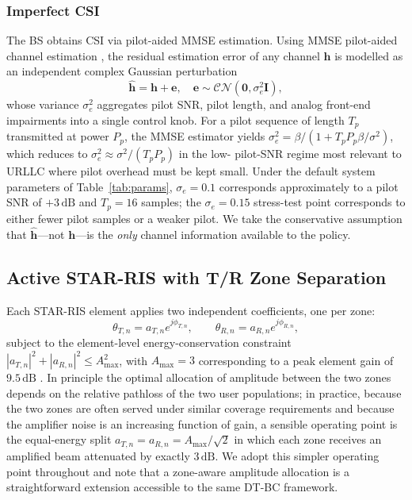 \documentclass[journal]{IEEEtran}
\newcommand{\vect}[1]{\bm{#1}}
\newcommand{\mat}[1]{\mathbf{#1}}
\newcommand{\cn}{\mathcal{CN}}
\begin{document}
\subsubsection*{Imperfect CSI} The BS obtains CSI via pilot-aided MMSE
estimation. Using MMSE pilot-aided channel estimation \cite{hassibi2003how},
the residual estimation error of any channel $\vect{h}$ is modelled
as an independent complex Gaussian perturbation
\begin{equation}
  \hat{\vect{h}}=\vect{h}+\vect{e},\quad
  \vect{e}\sim\cn(\vect{0},\sigma_e^2\mat{I}),
  \label{eq:csi}
\end{equation}
whose variance $\sigma_e^2$ aggregates pilot SNR, pilot length, and
analog front-end impairments into a single control knob. For a pilot
sequence of length $T_p$ transmitted at power $P_p$, the MMSE
estimator yields $\sigma_e^2=\beta/(1+T_pP_p\beta/\sigma^2)$, which
reduces to $\sigma_e^2\!\approx\!\sigma^2/(T_pP_p)$ in the low-%
pilot-SNR regime most relevant to URLLC where pilot overhead must be
kept small. Under the default system parameters of
Table~\ref{tab:params}, $\sigma_e\!=\!0.1$ corresponds approximately
to a pilot SNR of $+3\,\text{dB}$ and $T_p\!=\!16$ samples; the
$\sigma_e\!=\!0.15$ stress-test point corresponds to either fewer
pilot samples or a weaker pilot. We take the conservative assumption
that $\hat{\vect{h}}$---not $\vect{h}$---is the \emph{only} channel
information available to the policy.

\subsection{Active STAR-RIS with T/R Zone Separation}
\label{sec:starris}

Each STAR-RIS element applies two independent coefficients, one per
zone:
\begin{equation}
  \theta_{T,n}=a_{T,n}e^{j\phi_{T,n}},\qquad
  \theta_{R,n}=a_{R,n}e^{j\phi_{R,n}},
  \label{eq:theta}
\end{equation}
subject to the element-level energy-conservation constraint
$|a_{T,n}|^2+|a_{R,n}|^2\!\le\!A_{\max}^2$, with $A_{\max}=3$
corresponding to a peak element gain of $9.5\,\text{dB}$
\cite{long2021active,zhang2023activevspassive}. In principle the
optimal allocation of amplitude between the two zones depends on the
relative pathloss of the two user populations; in practice, because
the two zones are often served under similar coverage requirements
and because the amplifier noise is an increasing function of gain, a
sensible operating point is the equal-energy split
$a_{T,n}\!=\!a_{R,n}\!=\!A_{\max}/\sqrt{2}$ in which each zone
receives an amplified beam attenuated by exactly $3\,\text{dB}$. We
adopt this simpler operating point throughout and note that a
zone-aware amplitude allocation is a straightforward extension
accessible to the same DT-BC framework.
\end{document}
